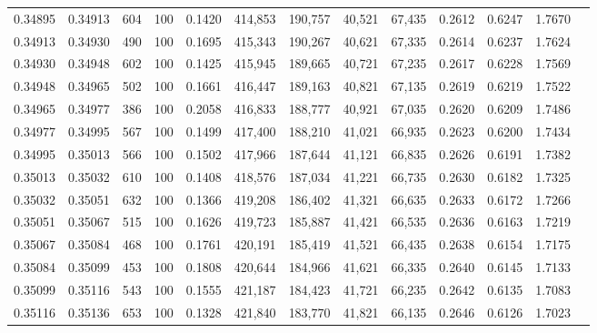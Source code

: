 \begin{tabular}{rrrrrrrrrrrrr}
0.34895 & 0.34913 &   604 & 100 &                                     0.1420 & 414,853 & 190,757 &  40,521 &  67,435 & 0.2612 & 0.6247 & 1.7670 \\
0.34913 & 0.34930 &   490 & 100 &                                     0.1695 & 415,343 & 190,267 &  40,621 &  67,335 & 0.2614 & 0.6237 & 1.7624 \\
0.34930 & 0.34948 &   602 & 100 &                                     0.1425 & 415,945 & 189,665 &  40,721 &  67,235 & 0.2617 & 0.6228 & 1.7569 \\
0.34948 & 0.34965 &   502 & 100 &                                     0.1661 & 416,447 & 189,163 &  40,821 &  67,135 & 0.2619 & 0.6219 & 1.7522 \\
0.34965 & 0.34977 &   386 & 100 &                                     0.2058 & 416,833 & 188,777 &  40,921 &  67,035 & 0.2620 & 0.6209 & 1.7486 \\
0.34977 & 0.34995 &   567 & 100 &                                     0.1499 & 417,400 & 188,210 &  41,021 &  66,935 & 0.2623 & 0.6200 & 1.7434 \\
0.34995 & 0.35013 &   566 & 100 &                                     0.1502 & 417,966 & 187,644 &  41,121 &  66,835 & 0.2626 & 0.6191 & 1.7382 \\
0.35013 & 0.35032 &   610 & 100 &                                     0.1408 & 418,576 & 187,034 &  41,221 &  66,735 & 0.2630 & 0.6182 & 1.7325 \\
0.35032 & 0.35051 &   632 & 100 &                                     0.1366 & 419,208 & 186,402 &  41,321 &  66,635 & 0.2633 & 0.6172 & 1.7266 \\
0.35051 & 0.35067 &   515 & 100 &                                     0.1626 & 419,723 & 185,887 &  41,421 &  66,535 & 0.2636 & 0.6163 & 1.7219 \\
0.35067 & 0.35084 &   468 & 100 &                                     0.1761 & 420,191 & 185,419 &  41,521 &  66,435 & 0.2638 & 0.6154 & 1.7175 \\
0.35084 & 0.35099 &   453 & 100 &                                     0.1808 & 420,644 & 184,966 &  41,621 &  66,335 & 0.2640 & 0.6145 & 1.7133 \\
0.35099 & 0.35116 &   543 & 100 &                                     0.1555 & 421,187 & 184,423 &  41,721 &  66,235 & 0.2642 & 0.6135 & 1.7083 \\
0.35116 & 0.35136 &   653 & 100 &                                     0.1328 & 421,840 & 183,770 &  41,821 &  66,135 & 0.2646 & 0.6126 & 1.7023 \\

\end{tabular}
